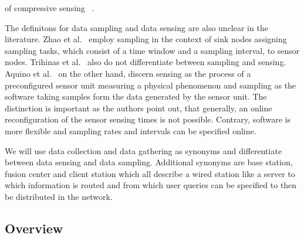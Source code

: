 of compressive sensing
~\cite{cheng2013stcdg,luo2009compressive,wang2012data}.
\par
The definitons for data sampling and data sensing are also unclear in the
literature. Zhao et al.~\cite{zhao2016cats} employ sampling in the context of
sink nodes assigning sampling tasks, which consist of a time window and a
sampling interval, to sensor nodes. Trihinas et al.~\cite{trihinas2015adam}
also do not differentiate between sampling and sensing. Aquino et
al.~\cite{aquino2014musa} on the other hand, discern sensing as the process of
a preconfigured sensor unit measuring a physical phenomenon and sampling as the
software taking samples form the data generated by the sensor unit. The
distinction is important as the authors point out, that generally, an online
reconfiguration of the sensor sensing times is not possible. Contrary, software
is more flexible and sampling rates and intervals can be specified online.
\par
We will use data collection and data gathering as synonyms and differentiate
between data sensing and data sampling. Additional synonyms are base station,
fusion center and client station which all describe a wired station like a
server to which information is routed and from which user queries can be
specified to then be distributed in the network.

\subsection{Overview}
\label{sec:Overview}


